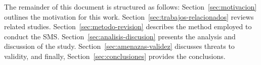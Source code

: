 The remainder of this document is structured as follows:
Section~\ref{sec:motivacion} outlines the motivation for this work.
Section~\ref{sec:trabajos-relacionados} reviews related studies.
Section~\ref{sec:metodo-revision} describes the method employed to conduct the SMS.
Section~\ref{sec:analisis-discusion} presents the analysis and discussion of the study.
Section~\ref{sec:amenazas-validez} discusses threats to validity, and finally,
Section~\ref{sec:conclusiones} provides the conclusions.
